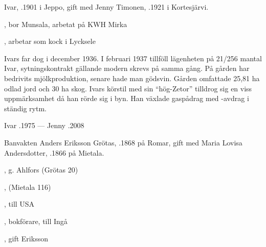 Ivar, .1901 i Jeppo, gift med Jenny Timonen, .1921 i Kortesjärvi.
\begin{jhchildren}
  \item {}, bor Munsala, arbetat på KWH Mirka
  \item {}
  \item {}
  \item {}, arbetar som kock i Lycksele
\end{jhchildren}
Ivars far dog i december 1936. I februari 1937 tillföll lägenheten på 21/256 mantal Ivar, sytningskontrakt gällande modern skrevs på samma gång. På gården har bedrivits mjölkproduktion, senare hade man gödsvin. Gården omfattade 25,81 ha odlad jord och 30 ha skog. Ivars körstil med sin ``hög-Zetor'' tilldrog sig en viss uppmärksamhet då han rörde sig i byn. Han växlade gaspådrag med -avdrag i ständig rytm.

Ivar .1975  ---  Jenny .2008





Banvakten Anders Eriksson Grötas, .1868 på Romar, gift med Maria	Lovisa Andersdotter, .1866 på Mietala.
\begin{jhchildren}
  \item {}, g. Ahlfors (Grötas 20)
  \item {}
  \item {}, (Mietala 116)
  \item {}, till USA
  \item {}
  \item {}, bokförare, till Ingå
  \item {}, gift Eriksson
\end{jhchildren}

